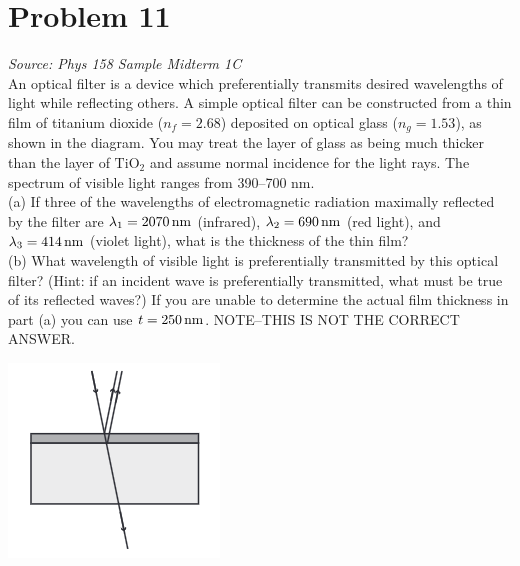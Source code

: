\documentclass[11pt, fleqn]{article}
\begin{document}
\section*{Problem 11}
\textit{Source: Phys 158 Sample Midterm 1C}\\
An optical filter is a device which preferentially transmits desired wavelengths of light while reflecting others.
A simple optical filter can be constructed from a thin film of titanium dioxide ($n_f = 2.68$) deposited on optical
glass ($n_g = 1.53$), as shown in the diagram. You may treat the layer of glass as being much thicker than the layer
of $\mathrm{TiO_2}$ and assume normal incidence for the light rays. The spectrum of visible light ranges from 390–700 nm.\\
(a) If three of the wavelengths of electromagnetic radiation maximally reflected by the filter are $\lambda_1 = 2070 \,\mathrm{nm}$
(infrared),  $\lambda_2 = 690 \,\mathrm{nm}$ (red light), and  $\lambda_3 = 414 \,\mathrm{nm}$ (violet light), what is the thickness of the thin film?\\
(b) What wavelength of visible light is preferentially transmitted by this optical filter? (Hint: if an incident wave
is preferentially transmitted, what must be true of its reflected waves?) If you are unable to determine the
actual film thickness in part (a) you can use $t = 250\,\mathrm{nm}$. NOTE–THIS IS NOT THE CORRECT ANSWER.\\
\centerline{\includegraphics{Images/ThinFilmBlock.png}}
\end{document}
